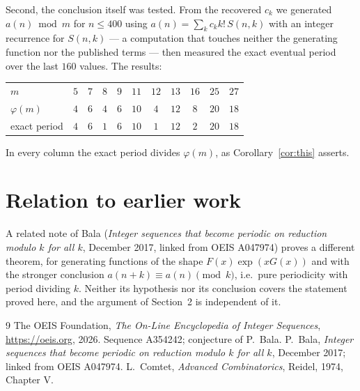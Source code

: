 \documentclass[11pt,a4paper]{article}
\theoremstyle{plain}
\theoremstyle{definition}
\begin{document}
Second, the conclusion itself was tested. From the recovered $c_{k}$ we generated
$a(n)\bmod m$ for $n\le400$ using $a(n)=\sum_{k}c_{k}k!\,S(n,k)$ with an integer
recurrence for $S(n,k)$ --- a computation that touches neither the generating function nor
the published terms --- then measured the exact eventual period over the last $160$
values. The results:

\begin{center}
\begin{tabular}{@{}lcccccccccc@{}}
\toprule
$m$  & $5$ & $7$ & $8$ & $9$ & $11$ & $12$ & $13$ & $16$ & $25$ & $27$\\
$\varphi(m)$  & $4$ & $6$ & $4$ & $6$ & $10$ & $4$ & $12$ & $8$ & $20$ & $18$\\
exact period  & $4$ & $6$ & $1$ & $6$ & $10$ & $1$ & $12$ & $2$ & $20$ & $18$\\
\bottomrule
\end{tabular}
\end{center}

\noindent
In every column the exact period divides $\varphi(m)$, as Corollary~\ref{cor:this}
asserts.

\section{Relation to earlier work}

A related note of Bala (\emph{Integer sequences that become periodic on reduction modulo
$k$ for all $k$}, December 2017, linked from OEIS A047974) proves a different theorem, for
generating functions of the shape $F(x)\exp(xG(x))$ and with the stronger conclusion
$a(n+k)\equiv a(n)\pmod{k}$, i.e.\ pure periodicity with period dividing $k$. Neither its
hypothesis nor its conclusion covers the statement proved here, and the argument of
Section~2 is independent of it.

\begin{thebibliography}{9}
 The OEIS Foundation, \emph{The On-Line Encyclopedia of Integer Sequences},
\url{https://oeis.org}, 2026. Sequence A354242; conjecture of P.\ Bala.
 P.\ Bala, \emph{Integer sequences that become periodic on reduction modulo
$k$ for all $k$}, December 2017; linked from OEIS A047974.
 L.\ Comtet, \emph{Advanced Combinatorics}, Reidel, 1974, Chapter V.
\end{thebibliography}
\end{document}
